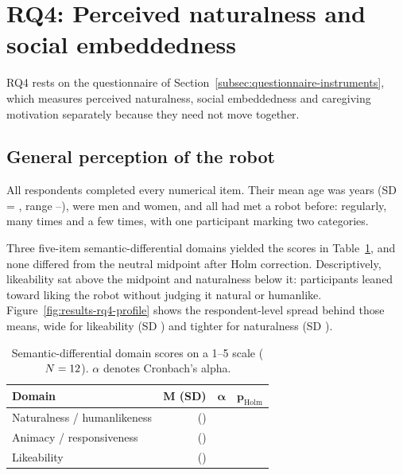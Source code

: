 \section{RQ4: Perceived naturalness and social embeddedness}
\label{subsec:results-rq4}

RQ4 rests on the questionnaire of Section~\ref{subsec:questionnaire-instruments}, which measures perceived naturalness, social embeddedness and caregiving motivation separately because they need not move together.

\subsection{General perception of the robot}

All \CoreCohortN{} respondents completed every numerical item. Their mean age was \CoreCohortAgeMean{} years (SD = \CoreCohortAgeSD{}, range \CoreCohortAgeMin{}--\CoreCohortAgeMax{}), \CoreCohortMen{} were men and \CoreCohortWomen{} women, and all had met a robot before: \CoreCohortRegularly{} regularly, \CoreCohortManyTimes{} many times and \CoreCohortFewTimes{} a few times, with one participant marking two categories.

Three five-item semantic-differential domains yielded the scores in Table~\ref{tab:rq4-sd}, and none differed from the neutral midpoint after Holm correction. Descriptively, likeability sat above the midpoint and naturalness below it: participants leaned toward liking the robot without judging it natural or humanlike. Figure~\ref{fig:results-rq4-profile} shows the respondent-level spread behind those means, wide for likeability (SD \CoreSDLikeabilitySD{}) and tighter for naturalness (SD \CoreSDNaturalnessSD{}).

\begin{table}[htbp]
    \centering
    \small
    \caption[Semantic-differential domain scores.]{Semantic-differential domain scores on a 1--5 scale ($N=12$). $\alpha$ denotes Cronbach's alpha.}
    \label{tab:rq4-sd}
    \begin{tabular}{@{}lrrr@{}}
        \toprule
        \textbf{Domain} & \textbf{M (SD)} & $\boldsymbol{\alpha}$ & $\boldsymbol{p_{\mathrm{Holm}}}$ \\
        \midrule
        Naturalness / humanlikeness & \CoreSDNaturalnessMean{} (\CoreSDNaturalnessSD{}) & \CoreSDNaturalnessAlpha{} & \CoreSDNaturalnessPHolm{} \\
        Animacy / responsiveness    & \CoreSDAnimacyMean{} (\CoreSDAnimacySD{}) & \CoreSDAnimacyAlpha{} & \CoreSDAnimacyPHolm{} \\
        Likeability                 & \CoreSDLikeabilityMean{} (\CoreSDLikeabilitySD{}) & \CoreSDLikeabilityAlpha{} & \CoreSDLikeabilityPHolm{} \\
        \bottomrule
    \end{tabular}
\end{table}

